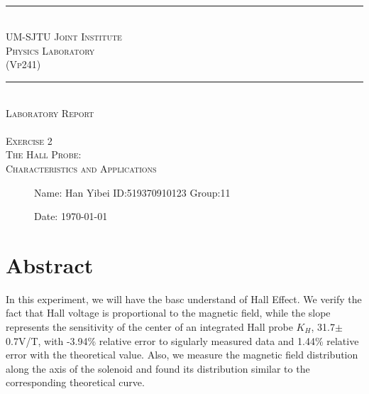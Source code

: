 \documentclass[12pt,a4paper]{article}
\begin{document}
\begin{center}
~\\
\rule[0mm]{400pt}{0.5pt}
\Large{ \textsc{\newline\\UM-SJTU Joint Institute\\Physics Laboratory\\(Vp241)\\}}
\rule[0mm]{400pt}{0.5pt}
\Large{ \textsc{\newline\newline\newline\newline\newline\newline\\
Laboratory Report\\}}
\Large{\textsc{ \\ Exercise 2  \\ The Hall Probe: \\ Characteristics and Applications} }

\end{center}

\begin{description}
    \item[] 
    \item[] 
    \item[] 
    \item[] 
    \item[] 
    \item[]
    \item[]\qquad \qquad Name: Han Yibei \qquad ID:519370910123   \qquad    Group:11\\
    \item[]\qquad \qquad Date: \today
\end{description}

\newpage

\section{Abstract}
In this experiment, we will have the basc understand of Hall Effect. We verify the fact that Hall voltage is proportional to the magnetic field, while the slope represents the sensitivity of the center of an integrated Hall probe $K_H$, 31.7$\pm$0.7V/T, with -3.94\% relative error to sigularly measured data and 1.44\% relative error with the theoretical value. Also, we measure the magnetic field distribution along the axis of the solenoid and found its distribution similar to the corresponding theoretical curve.
\end{document}
